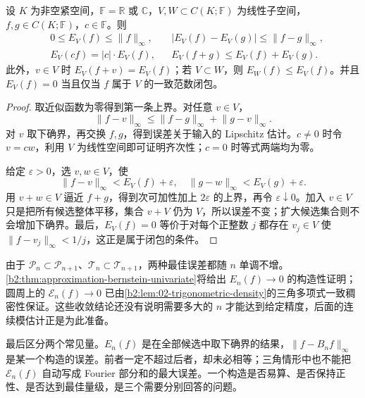 \begin{proposition}
\label{b2:prop:approximation-error-properties}
设 \(K\) 为非空紧空间，\(\mathbb F=\mathbb R\) 或 \(\mathbb C\)，\(V,W\subset C(K;\mathbb F)\) 为线性子空间，\(f,g\in C(K;\mathbb F)\)，\(c\in\mathbb F\)。则
\[
\begin{aligned}
 &0\leq E_V(f)\leq\lVert f\rVert_\infty,
 &&|E_V(f)-E_V(g)|\leq\lVert f-g\rVert_\infty,\\
 &E_V(cf)=|c|\cdot E_V(f),
 &&E_V(f+g)\leq E_V(f)+E_V(g).
\end{aligned}
\]
此外，\(v\in V\) 时 \(E_V(f+v)=E_V(f)\)；若 \(V\subset W\)，则 \(E_W(f)\leq E_V(f)\)。并且 \(E_V(f)=0\) 当且仅当 \(f\) 属于 \(V\) 的一致范数闭包。
\end{proposition}
\begin{proof}
取近似函数为零得到第一条上界。对任意 \(v\in V\)，
\[
 \lVert f-v\rVert_\infty
 \leq\lVert f-g\rVert_\infty+\lVert g-v\rVert_\infty.
\]
对 \(v\) 取下确界，再交换 \(f,g\)，得到误差关于输入的 Lipschitz 估计。\(c\neq0\) 时令 \(v=cw\)，利用 \(V\) 为线性空间即可证明齐次性；\(c=0\) 时等式两端均为零。

给定 \(\varepsilon>0\)，选 \(v,w\in V\)，使
\[
 \lVert f-v\rVert_\infty<E_V(f)+\varepsilon,
 \quad \lVert g-w\rVert_\infty<E_V(g)+\varepsilon.
\]
用 \(v+w\in V\) 逼近 \(f+g\)，得到次可加性加上 \(2\varepsilon\) 的上界，再令 \(\varepsilon\downarrow0\)。加入 \(v\in V\) 只是把所有候选整体平移，集合 \(v+V\) 仍为 \(V\)，所以误差不变；扩大候选集合则不会增加下确界。最后，\(E_V(f)=0\) 等价于对每个正整数 \(j\) 都存在 \(v_j\in V\) 使 \(\lVert f-v_j\rVert_\infty<1/j\)，这正是属于闭包的条件。
\end{proof}

由于 \(\mathcal P_n\subset\mathcal P_{n+1}\)、\(\mathcal T_n\subset\mathcal T_{n+1}\)，两种最佳误差都随 \(n\) 单调不增。\cref{b2:thm:approximation-bernstein-univariate}将给出 \(E_n(f)\to0\) 的构造性证明；圆周上的 \(\mathcal E_n(f)\to0\) 已由\cref{b2:lem:02-trigonometric-density}的三角多项式一致稠密性保证。这些收敛结论还没有说明需要多大的 \(n\) 才能达到给定精度，后面的连续模估计正是为此准备。

\ProseParagraphBreak
最后区分两个常见量。\(E_n(f)\) 是在全部候选中取下确界的结果，\(\lVert f-B_nf\rVert_\infty\) 是某一个构造的误差。前者一定不超过后者，却未必相等；三角情形中也不能把 \(\mathcal E_n(f)\) 自动写成 Fourier 部分和的最大误差。一个构造是否易算、是否保持正性、是否达到最佳量级，是三个需要分别回答的问题。
